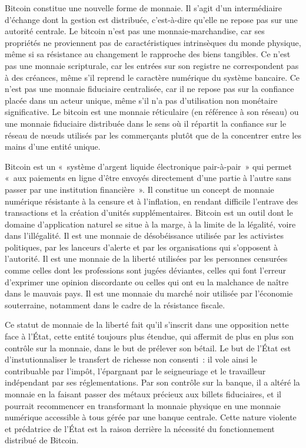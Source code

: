 Bitcoin constitue une nouvelle forme de monnaie. Il s'agit d'un intermédiaire d'échange dont la gestion est distribuée, c'est-à-dire qu'elle ne repose pas sur une autorité centrale. Le bitcoin n'est pas une monnaie-marchandise, car ses propriétés ne proviennent pas de caractéristiques intrinsèques du monde physique, même si sa résistance au changement le rapproche des biens tangibles. Ce n'est pas une monnaie scripturale, car les entrées sur son registre ne correspondent pas à des créances, même s'il reprend le caractère numérique du système bancaire. Ce n'est pas une monnaie fiduciaire centralisée, car il ne repose pas sur la confiance placée dans un acteur unique, même s'il n'a pas d'utilisation non monétaire significative. Le bitcoin est une monnaie réticulaire (en référence à son réseau) ou une monnaie fiduciaire distribuée dans le sens où il répartit la confiance sur le réseau de nœuds utilisés par les commerçants plutôt que de la concentrer entre les mains d'une entité unique.

Bitcoin est un «~système d'argent liquide électronique pair-à-pair~» qui permet «~aux paiements en ligne d'être envoyés directement d'une partie à l'autre sans passer par une institution financière~». Il constitue un concept de monnaie numérique résistante à la censure et à l'inflation, en rendant difficile l'entrave des transactions et la création d'unités supplémentaires. Bitcoin est un outil dont le domaine d'application naturel se situe à la marge, à la limite de la légalité, voire dans l'illégalité. Il est une monnaie de désobéissance utilisée par les activistes politiques, par les lanceurs d'alerte et par les organisations qui s'opposent à l'autorité. Il est une monnaie de la liberté utilisées par les personnes censurées comme celles dont les professions sont jugées déviantes, celles qui font l'erreur d'exprimer une opinion discordante ou celles qui ont eu la malchance de naître dans le mauvais pays. Il est une monnaie du marché noir utilisée par l'économie souterraine, notamment dans le cadre de la résistance fiscale.

Ce statut de monnaie de la liberté fait qu'il s'inscrit dans une opposition nette face à l'État, cette entité toujours plus étendue, qui affermit de plus en plus son contrôle sur la monnaie, dans le but de prélever son bétail. Le but de l'État est d'instutionnaliser le transfert de richesse non consenti~: il vole ainsi le contribuable par l'impôt, l'épargnant par le seigneuriage et le travailleur indépendant par ses réglementations. Par son contrôle sur la banque, il a altéré la monnaie en la faisant passer des métaux précieux aux billets fiduciaires, et il pourrait recommencer en transformant la monnaie physique en une monnaie numérique accessible à tous gérée par une banque centrale. Cette nature violente et prédatrice de l'État est la raison derrière la nécessité du fonctionnement distribué de Bitcoin.

